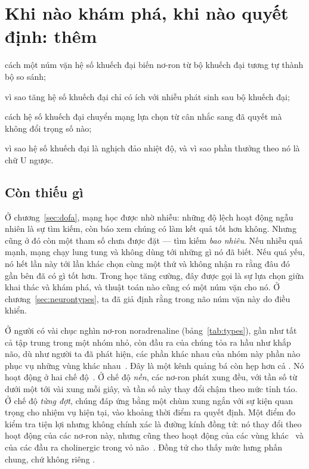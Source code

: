 \chapter{Khi nào khám phá, khi nào quyết định: thêm }
\label{sec:nora}
\begin{chaptergoals}
\item cách một núm vặn hệ số khuếch đại biến nơ-ron từ bộ khuếch đại tương tự thành bộ so sánh;
\item vì sao tăng hệ số khuếch đại chỉ có ích với nhiễu phát sinh sau bộ khuếch đại;
\item cách hệ số khuếch đại chuyển mạng lựa chọn từ cân nhắc sang đã quyết mà không đổi trọng số nào;
\item vì sao hệ số khuếch đại là nghịch đảo nhiệt độ, và vì sao phần thưởng theo nó là chữ U ngược.
\end{chaptergoals}

\section{Còn thiếu gì}

Ở chương~\ref{sec:dofa}, mạng học được nhờ nhiễu: những độ lệch hoạt động ngẫu nhiên là sự tìm kiếm, còn  báo xem chúng có làm kết quả tốt hơn không. Nhưng cũng ở đó còn một tham số chưa được đặt --- tìm kiếm \emph{bao nhiêu}. Nếu nhiễu quá mạnh, mạng chạy lung tung và không dùng tới những gì nó đã biết. Nếu quá yếu, nó hết lần này tới lần khác chọn cùng một thứ và không nhận ra rằng đâu đó gần bên đã có gì tốt hơn. Trong học tăng cường, đây được gọi là sự lựa chọn giữa khai thác và khám phá, và thuật toán nào cũng có một núm vặn cho nó. Ở chương~\ref{sec:neurontypes}, ta đã giả định rằng trong não núm vặn này do  điều khiển.

Ở người có vài chục nghìn nơ-ron noradrenaline (bảng~\ref{tab:types}), gần như tất cả tập trung trong một nhóm nhỏ, còn đầu ra của chúng tỏa ra hầu như khắp não, dù như người ta đã phát hiện, các phần khác nhau của nhóm này phần nào phục vụ những vùng khác nhau~\cite{Poe2020}. Đây là một kênh quảng bá còn hẹp hơn cả . Nó hoạt động ở hai chế độ~\cite{AstonJones2005}. Ở chế độ \emph{nền}, các nơ-ron phát xung đều, với tần số từ dưới một tới vài xung mỗi giây, và tần số này thay đổi chậm theo mức tỉnh táo. Ở chế độ \emph{từng đợt}, chúng đáp ứng bằng một chùm xung ngắn với sự kiện quan trọng cho nhiệm vụ hiện tại, vào khoảng thời điểm ra quyết định. Một điểm đo kiểm tra tiện lợi nhưng không chính xác là đường kính đồng tử: nó thay đổi theo hoạt động của các nơ-ron này, nhưng cũng theo hoạt động của các vùng khác~\cite{Joshi2016} và của các đầu ra cholinergic trong vỏ não~\cite{Reimer2016}. Đồng tử cho thấy mức hưng phấn chung, chứ không riêng .

